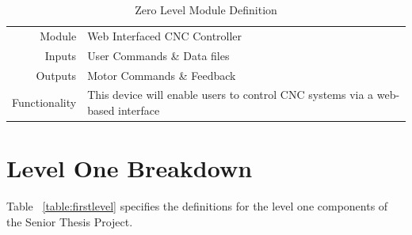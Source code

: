 \begin{table}[h] 
	\caption{Zero Level Module Definition}
	\label{table:zerolevel}
	\centering 
	\begin{tabular}{|r p{10cm}|} 
		\hline\hline
		Module		& Web Interfaced CNC Controller \\ 
		Inputs		& User Commands \& Data files 	\\ 
		Outputs		& Motor Commands \& Feedback	\\ 
		Functionality	& This device will enable users to control CNC systems via a web-based interface 	\\ 
		\hline
		\end{tabular} 
\end{table}

\section{Level One Breakdown}
Table ~\ref{table:firstlevel} specifies the definitions for the level one components of the Senior Thesis Project. 
